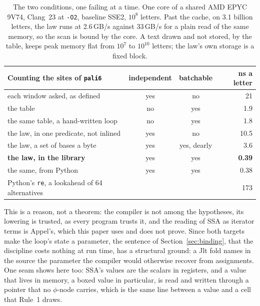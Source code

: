 \begin{table}[htbp]
\centering
\small
\begin{tabular}{@{}lccr@{}}
\toprule
Counting the sites of \texttt{pali6} & independent & batchable & ns a letter \\
\midrule
each window asked, as defined & yes & no & 21 \\
the table & no & yes & 1.9 \\
\quad the same table, a hand-written loop & no & yes & 1.8 \\
the law, in one predicate, not inlined & yes & no & 10.5 \\
the law, a set of bases a byte & yes & yes, dearly & 3.6 \\
\textbf{the law, in the library} & yes & yes & \textbf{0.39} \\
\quad the same, from Python & yes & yes & 0.38 \\
Python's \texttt{re}, a lookahead of 64 alternatives & & & 173 \\
\bottomrule
\end{tabular}
\caption{The two conditions, one failing at a time.
One core of a shared AMD EPYC 9V74, Clang~23 at \texttt{-O2}, baseline SSE2, $10^8$ letters.
Past the cache, on 3.1 billion letters, the law runs at 2.6\,GB/s against 33\,GB/s for a plain read of the same memory, so the scan is bound by the core.
A text drawn and not stored, by the table, keeps peak memory flat from $10^7$ to $10^{10}$ letters; the law's own storage is a fixed block.}
\label{tab:batch}
\end{table}

This is a reason, not a theorem: the compiler is not among the hypotheses, its lowering is trusted, as every \Cpp{} program trusts it, and the reading of SSA as iterator terms is Appel's, which this paper uses and does not prove.
Since both targets make the loop's state a parameter, the sentence of Section~\ref{sec:binding}, that the discipline costs nothing at run time, has a structural ground: a Jlt fold names in the source the parameter the compiler would otherwise recover from assignments.
One seam shows here too: SSA's values are the scalars in registers, and a value that lives in memory, a boxed value in particular, is read and written through a pointer that no $\phi$-node carries, which is the same line between a value and a cell that Rule~1 draws.

